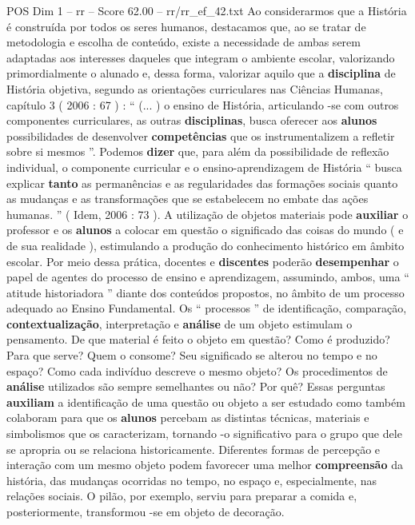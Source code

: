 \begin{textsample}{POS Dim 1 – rr – Score 62.00 – rr/rr\_ef\_42.txt}
Ao considerarmos que a História é construída por todos os seres humanos, destacamos que, ao se tratar de metodologia e escolha de conteúdo, existe a necessidade de ambas serem adaptadas aos interesses daqueles que integram o ambiente escolar, valorizando primordialmente o alunado e, dessa forma, valorizar aquilo que a \textbf{disciplina} de História objetiva, segundo as orientações curriculares nas Ciências Humanas, capítulo 3 ( 2006 : 67 ) : “ (... ) o ensino de História, articulando -se com outros componentes curriculares, as outras \textbf{disciplinas}, busca oferecer aos \textbf{alunos} possibilidades de desenvolver \textbf{competências} que os instrumentalizem a refletir sobre si mesmos ”.
Podemos \textbf{dizer} que, para além da possibilidade de reflexão individual, o componente curricular e o ensino-aprendizagem de História “ busca explicar \textbf{tanto} as permanências e as regularidades das formações sociais quanto as mudanças e as transformações que se estabelecem no embate das ações humanas. ” ( Idem, 2006 : 73 ).
A utilização de objetos materiais pode \textbf{auxiliar} o professor e os \textbf{alunos} a colocar em questão o significado das coisas do mundo ( e de sua realidade ), estimulando a produção do conhecimento histórico em âmbito escolar.
Por meio dessa prática, docentes e \textbf{discentes} poderão \textbf{desempenhar} o papel de agentes do processo de ensino e aprendizagem, assumindo, ambos, uma “ atitude historiadora ” diante dos conteúdos propostos, no âmbito de um processo adequado ao Ensino Fundamental.
Os “ processos ” de identificação, comparação, \textbf{contextualização}, interpretação e \textbf{análise} de um objeto estimulam o pensamento.
De que material é feito o objeto em questão?
Como é produzido?
Para que serve?
Quem o consome?
Seu significado se alterou no tempo e no espaço?
Como cada indivíduo descreve o mesmo objeto?
Os procedimentos de \textbf{análise} utilizados são sempre semelhantes ou não?
Por quê?
Essas perguntas \textbf{auxiliam} a identificação de uma questão ou objeto a ser estudado como também colaboram para que os \textbf{alunos} percebam as distintas técnicas, materiais e simbolismos que os caracterizam, tornando -o significativo para o grupo que dele se apropria ou se relaciona historicamente.
Diferentes formas de percepção e interação com um mesmo objeto podem favorecer uma melhor \textbf{compreensão} da história, das mudanças ocorridas no tempo, no espaço e, especialmente, nas relações sociais.
O pilão, por exemplo, serviu para preparar a comida e, posteriormente, transformou -se em objeto de decoração.

\end{textsample}
